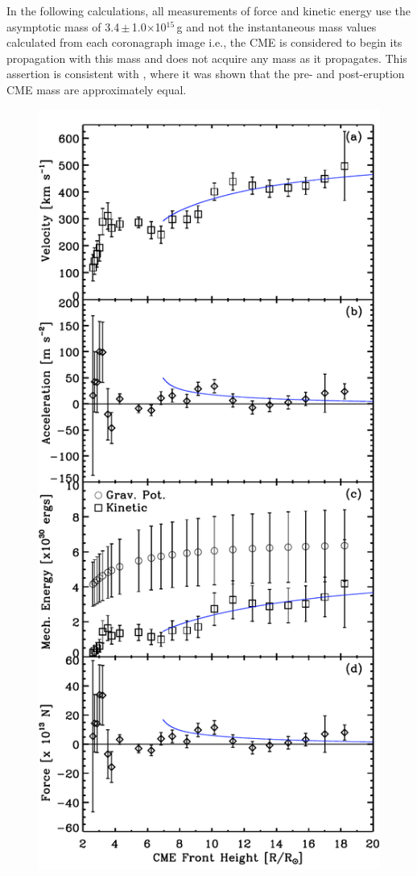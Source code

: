 In the following calculations, all measurements of force and kinetic energy use the asymptotic mass of 3.4\,$\pm$\,1.0$\times$10$^{15}$\,g and not the instantaneous mass values calculated from each coronagraph image i.e., the CME is considered to begin its propagation with this mass and does not acquire any mass as it propagates. This assertion is consistent with \citet{aschw09}, where it was shown that the pre- and post-eruption CME mass are approximately equal.

\begin{figure}[t!]
\begin{center}
\includegraphics[scale=0.65, trim=0cm 0cm 0cm 1cm]{images/20081212_force_v3.pdf}

\end{center}
\end{figure}
